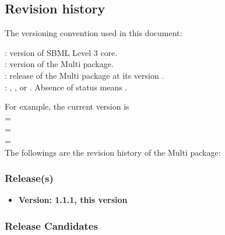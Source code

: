 \subsection{Revision history}
\label{def:revision_history}

The versioning convention used in this document: \\

: version of SBML Level 3 core. \\
: version of the Multi package. \\
: release of the Multi package at its version . \\ 
: , , or . Absence of status means .

For example, the current version is \val{\thisVersion} \\
 = \val{\thisCoreVersion} \\
 = \val{\thisMultiVersion} \\
 = \val{\thisMultiRelease} \\

The followings are the revision history of the Multi package:

\newcommand{\mVersionTileFont}[1]{\textbf{#1}}

\subsubsection{Release(s)}

\begin{itemize}
 \item \mVersionTileFont{Version: 1.1.1, this version} 
 \label{def:v1_1_1}
 \end{itemize}


\subsubsection{Release Candidates}

